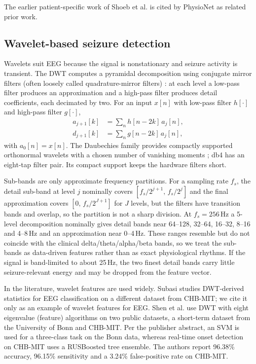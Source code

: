 \documentclass[10pt,twocolumn,letterpaper]{article}
\begin{document}
The earlier patient-specific work of Shoeb et al. \cite{shoeb2004patient}
is cited by PhysioNet as related prior work.

\subsection{Wavelet-based seizure detection}

Wavelets suit EEG because the signal is nonstationary and seizure
activity is transient. The DWT computes a pyramidal decomposition using
conjugate mirror filters (often loosely called quadrature-mirror
filters) \cite{mallat1989theory}: at each level a low-pass filter
produces an approximation and a high-pass filter produces detail
coefficients, each decimated by two. For an input $x[n]$ with low-pass
filter $h[\cdot]$ and high-pass filter $g[\cdot]$,
\begin{align}
a_{j+1}[k] &= \sum_n h[n-2k]\,a_j[n], \\
d_{j+1}[k] &= \sum_n g[n-2k]\,a_j[n],
\end{align}
with $a_0[n]=x[n]$. The Daubechies family provides compactly supported
orthonormal wavelets with a chosen number of vanishing moments
\cite{daubechies1988orthonormal}; db4 has an eight-tap filter pair. Its
compact support keeps the hardware filters short.

Sub-bands are only approximate frequency partitions. For a sampling rate
$f_s$, the detail sub-band at level $j$ nominally covers
$[f_s/2^{j+1},\,f_s/2^{j}]$ and the final approximation covers
$[0,\,f_s/2^{J+1}]$ for $J$ levels, but the filters have transition
bands and overlap, so the partition is not a sharp division. At
$f_s=256$\,Hz a 5-level decomposition nominally gives detail bands near
64--128, 32--64, 16--32, 8--16 and 4--8\,Hz and an approximation near
0--4\,Hz. These ranges resemble but do not coincide with the clinical
delta/theta/alpha/beta bands, so we treat the sub-bands as data-driven
features rather than as exact physiological rhythms. If the signal is
band-limited to about 25\,Hz, the two finest detail bands carry little
seizure-relevant energy and may be dropped from the feature vector.

In the literature, wavelet features are used widely. Subasi
\cite{subasi2007eeg} studies DWT-derived statistics for EEG
classification on a different dataset from CHB-MIT; we cite it only as an
example of wavelet features for EEG.
Shen et al. \cite{shen2022dwt} use DWT with eight eigenvalue (feature)
algorithms on two public datasets, a short-term dataset from the
University of Bonn and CHB-MIT. Per the publisher abstract, an SVM is
used for a three-class task on the Bonn data, whereas real-time onset detection on CHB-MIT uses a
RUSBoosted tree ensemble. The authors report 96.38\% accuracy, 96.15\%
sensitivity and a 3.24\% false-positive rate on CHB-MIT.
\end{document}
